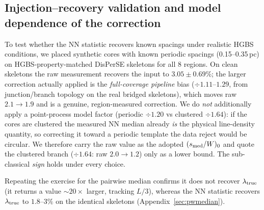 \documentclass[usenatbib,twoside,twocolumn]{mnras}
\begin{document}
\subsection{Injection--recovery validation and model dependence of the correction}
\label{sec:injection_recovery}

To test whether the NN statistic recovers known spacings under realistic HGBS conditions, we placed synthetic cores with known periodic spacings (0.15--0.35\,pc) on HGBS-property-matched DisPerSE skeletons for all 8 regions. On clean skeletons the raw measurement recovers the input to $3.05\pm0.69$\%; the larger correction actually applied is the \emph{full-coverage pipeline} bias ($\div1.11$--$1.29$, from junction/branch topology on the real bridged skeletons), which moves raw $2.1\to1.9$ and is a genuine, region-measured correction. We do \emph{not} additionally apply a point-process model factor (periodic $\div1.20$ vs clustered $\div1.64$): if the cores are clustered the measured NN median already \emph{is} the physical line-density quantity, so correcting it toward a periodic template the data reject would be circular. We therefore carry the raw value as the adopted $(s_{\rm med}/W)_0$ and quote the clustered branch ($\div1.64$: raw $2.0\to1.2$) only as a lower bound. The sub-classical \emph{sign} holds under every choice.

Repeating the exercise for the pairwise median confirms it does not recover $\lambda_{\rm true}$ (it returns a value $\sim$$20\times$ larger, tracking $L/3$), whereas the NN statistic recovers $\lambda_{\rm true}$ to $1.8$--$3\%$ on the identical skeletons (Appendix~\ref{sec:pwmedian}).
\end{document}
